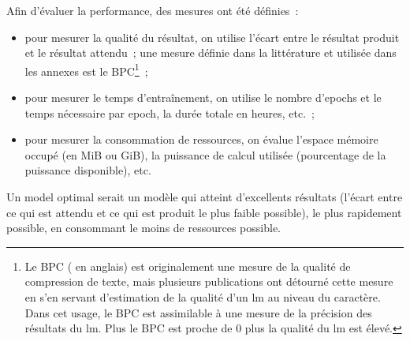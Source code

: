 Afin d'évaluer la performance, des mesures ont été définies~:
\begin{itemize}
	\item pour mesurer la qualité du résultat, on utilise l'écart entre le résultat produit et le résultat attendu~; une mesure définie dans la littérature et utilisée dans les annexes est le BPC\footnote{Le BPC ( en anglais) \autocite{BPC} est originalement une mesure de la qualité de compression de texte, mais plusieurs publications ont détourné cette mesure en s'en servant d'estimation de la qualité d'un \gls{lm} au niveau du caractère. Dans cet usage, le BPC est assimilable à une mesure de la précision des résultats du \gls{lm}. Plus le BPC est proche de 0 plus la qualité du \gls{lm} est élevé.}~;
	\item pour mesurer le temps d'entraînement, on utilise le nombre d'\glspl{epoch} et le temps nécessaire par \gls{epoch}, la durée totale en heures, etc.~;
	\item pour mesurer la consommation de ressources, on évalue l'espace mémoire occupé (en MiB ou GiB), la puissance de calcul utilisée (pourcentage de la puissance disponible), etc.
\end{itemize}
\vspace{1em}

Un \gls{model} optimal serait un modèle qui atteint d'excellents résultats  (l'écart entre ce qui est attendu et ce qui est produit le plus faible possible), le plus rapidement possible, en consommant le moins de ressources possible.

